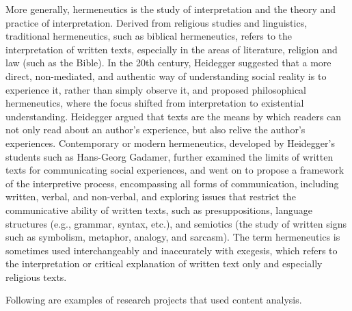 More generally, hermeneutics is the study of interpretation and the theory and practice of interpretation. Derived from religious studies and linguistics, traditional hermeneutics, such as biblical hermeneutics, refers to the interpretation of written texts, especially in the areas of literature, religion and law (such as the Bible). In the 20th century, Heidegger suggested that a more direct, non-mediated, and authentic way of understanding social reality is to experience it, rather than simply observe it, and proposed philosophical hermeneutics, where the focus shifted from interpretation to existential understanding. Heidegger argued that texts are the means by which readers can not only read about an author's experience, but also relive the author's experiences. Contemporary or modern hermeneutics, developed by Heidegger's students such as Hans-Georg Gadamer, further examined the limits of written texts for communicating social experiences, and went on to propose a framework of the interpretive process, encompassing all forms of communication, including written, verbal, and non-verbal, and exploring issues that restrict the communicative ability of written texts, such as presuppositions, language structures (e.g., grammar, syntax, etc.), and semiotics (the study of written signs such as symbolism, metaphor, analogy, and sarcasm). The term hermeneutics is sometimes used interchangeably and inaccurately with exegesis, which refers to the interpretation or critical explanation of written text only and especially religious texts.

Following are examples of research projects that used content analysis.

